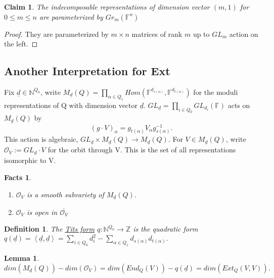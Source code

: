 \documentclass{book}
\newtheorem{lemma}[theorem]{Lemma}
\newtheorem{definition}[theorem]{Definition}
\newtheorem{claim}[theorem]{Claim}
\newtheorem* {facts*}{Facts}
\begin{document}
		\begin{claim}		
			The indecomposable representations of dimension vector $(m,1)$ for $0\leq m \leq n$ are parameterized by $Gr_m(\mathbb{F}^n)$
		\end{claim}
		
		\begin{proof}
			They are parameterized by $m\times n$ matrices of rank $m$ up to $GL_m$ action on the left. 
		\end{proof}


		\subsection{Another Interpretation for Ext}

			Fix $\underline{d} \in \mathbb{N}^{Q_0}$, write $M_{\underline{d}}(Q) = \displaystyle \prod_{\alpha \in Q_1} Hom(\mathbb{F}^{d_{s(\alpha)}}, \mathbb{F}^{d_{t(\alpha)}})$ for the moduli representations of Q with dimension vector $\underline{d}$. $GL_{\underline{d}} =  \displaystyle \prod_{i \in Q_0} GL_{d_i}(\mathbb{F})$ acts on $M_{\underline{d}}(Q)$ by $$(g \cdot V)_{\alpha} = g_{t(\alpha)} V_{\alpha} g_{s(\alpha)}^{-1}.$$  This action is algebraic, $GL_{\underline{d}} \times M_{\underline{d}}(Q) \rightarrow M_{\underline{d}}(Q) .$ For $V \in M_{\underline{d}}(Q)$, write $\mathcal{O}_V := GL_{\underline{d}}\cdot V$ for the orbit through V. This is the set of all representations isomorphic to V. 

		\begin{facts*}
			
		\begin{enumerate}
		
			\item   $\mathcal{O}_V$ is a smooth subvariety of  $M_{\underline{d}}(Q)$.		
		  \item  $\mathcal{O}_V$ is open in $\overline{\mathcal{O}_V}$
	
		\end{enumerate}
		\end{facts*}

		\begin{definition}
			The \underline{Tits form} $q:\mathbb{N}^{Q_0} \rightarrow \mathbb{Z}$ is the quadratic form $q(\underline{d})=\left<\underline{d},\underline{d}\right> = \displaystyle \sum_{i \in Q_0} d_i^2 - \sum_{\alpha \in Q_1} d_{s(\alpha)}d_{t(\alpha)}.$
		\end{definition}

		\begin{lemma}
			$dim(M_{\underline{d}}(Q)) - dim(\mathcal{O}_V) = dim(End_Q(V))-q(\underline{d}) = dim(Ext_Q(V,V)).$
		\end{lemma}
		
\end{document}
